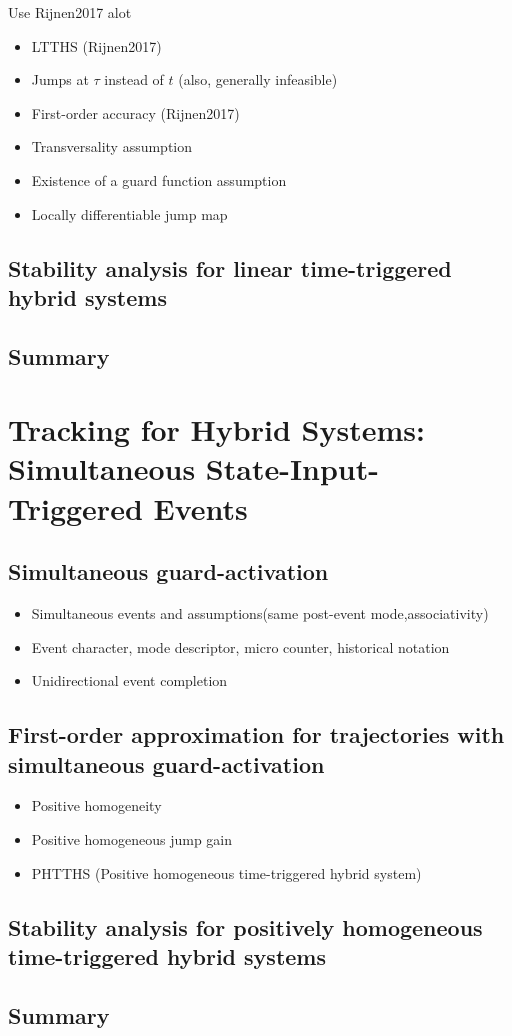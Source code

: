 \documentclass[../DC2017114Bouma.tex]{subfiles}
\begin{document}
Use Rijnen2017 alot
\begin{itemize}
\item LTTHS (Rijnen2017)
\item Jumps at $\tau$ instead of $t$ (also, generally infeasible)
\item First-order accuracy (Rijnen2017)
\item Transversality assumption
\item Existence of a guard function assumption
\item Locally differentiable jump map
\end{itemize}
\section{Stability analysis for linear time-triggered hybrid systems}

\section{Summary}


\cleartooddpage
\chapter{Tracking for Hybrid Systems: Simultaneous State-Input-Triggered Events}\label{ch:simult}
\cite{Rijnen2018}
\section{Simultaneous guard-activation}
\begin{itemize}
\item Simultaneous events and assumptions(same post-event mode,associativity)
\item Event character, mode descriptor, micro counter, historical notation
\item Unidirectional event completion
\end{itemize}
\section{First-order approximation for trajectories with simultaneous guard-activation}
\begin{itemize}
\item Positive homogeneity
\item Positive homogeneous jump gain
\item PHTTHS (Positive homogeneous time-triggered hybrid system)
\end{itemize}

\section{Stability analysis for positively homogeneous time-triggered hybrid systems}

\section{Summary}
\end{document}
